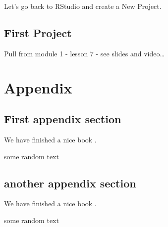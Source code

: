 \documentclass[]{book}
\theoremstyle{definition}
\theoremstyle{definition}
\theoremstyle{definition}
\theoremstyle{remark}
\begin{document}
Let's go back to RStudio and create a New Project.

\chapter{First Project}\label{firstproject}

Pull from module 1 - lesson 7 - see slides and video\ldots{}

\part{Appendix}\label{part-appendix}

\appendix


\chapter{First appendix section}\label{first-appendix-section}

We have finished a nice book .

some random  text

\chapter{another appendix section}\label{another-appendix-section}

We have finished a nice book .

some random  text



\printindex
\end{document}

